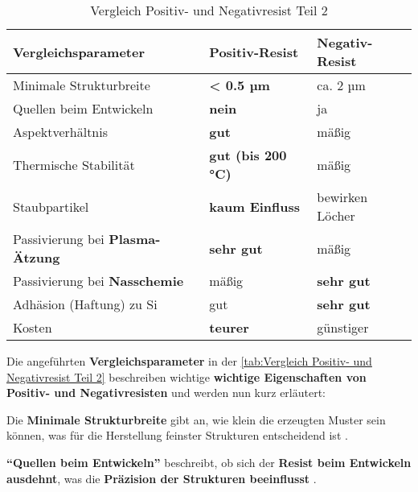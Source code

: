 \documentclass{article} %
\begin{document}
\begin{table}[htb!]
    \centering
    \renewcommand{\arraystretch}{1.5} %
    \begin{tabular}{|p{6cm}|p{3cm}|p{3cm}|}
        \hline
        \textbf{Vergleichsparameter} & \textbf{Positiv-Resist} & \textbf{Negativ-Resist} \\ \hline
        Minimale Strukturbreite & \textbf{< 0.5 µm} & ca. 2 µm \\ \hline
        Quellen beim Entwickeln & \textbf{nein} & ja \\ \hline
        Aspektverhältnis & \textbf{gut} & mäßig \\ \hline
        Thermische Stabilität & \textbf{gut (bis 200 °C)} & mäßig \\ \hline
        Staubpartikel & \textbf{kaum Einfluss} & bewirken Löcher \\ \hline
        Passivierung bei \textbf{Plasma-Ätzung} & \textbf{sehr gut} & mäßig \\ \hline
        Passivierung bei \textbf{Nasschemie} & mäßig & \textbf{sehr gut} \\ \hline
        Adhäsion (Haftung) zu Si & gut & \textbf{sehr gut} \\ \hline
        Kosten & \textbf{teurer} & günstiger \\ \hline
    \end{tabular}
    \captionsetup{labelfont=bf} %
    \caption{Vergleich Positiv- und Negativresist Teil 2 \cite{madou2002, wolf2000}}
    \label{tab:Vergleich Positiv- und Negativresist Teil 2}
\end{table}  

\vspace{1em}

Die angeführten \textbf{Vergleichsparameter} in der \autoref{tab:Vergleich Positiv- und Negativresist Teil 2} beschreiben wichtige \textbf{wichtige Eigenschaften von Positiv- und Negativresisten} und werden nun kurz erläutert: 

\vspace{1em}

Die \textbf{Minimale Strukturbreite} gibt an, wie klein die erzeugten Muster sein können, was für die Herstellung feinster Strukturen entscheidend ist \cite{madou2002, sciencedirect_photoresist}. 

\vspace{1em}

\textbf{``Quellen beim Entwickeln''} beschreibt, ob sich der \textbf{Resist beim Entwickeln ausdehnt}, was die \textbf{Präzision der Strukturen beeinflusst} \cite{hoegel2024}. 
\end{document}
